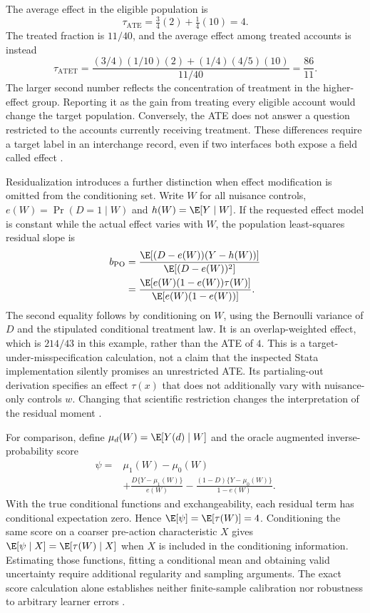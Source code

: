 The average effect in the eligible population is
\[
 \tau_{\mathrm{ATE}}=\tfrac34(2)+\tfrac14(10)=4.
\]
The treated fraction is $11/40$, and the average effect among treated
accounts is instead
\[
 \tau_{\mathrm{ATET}}
 =\frac{(3/4)(1/10)(2)+(1/4)(4/5)(10)}{11/40}
 =\frac{86}{11}.
\]
The larger second number reflects the concentration of treatment in the
higher-effect group. Reporting it as the gain from treating every eligible
account would change the target population. Conversely, the ATE does not
answer a question restricted to the accounts currently receiving treatment.
These differences require a target label in an interchange record, even if
two interfaces both expose a field called effect
\cite{exec13_ch_exact}.

Residualization introduces a further distinction when effect modification
is omitted from the conditioning set. Write $W$ for all nuisance controls,
$e(W)=\Pr(D=1\mid W)$ and $h(W)=\E[Y\mid W]$. If the requested effect
model is constant while the actual effect varies with $W$, the population
least-squares residual slope is
\begin{align*}
 b_{\mathrm{PO}}
 &=\frac{\E[(D-e(W))(Y-h(W))]}{\E[(D-e(W))^2]}\\
 &=\frac{\E[e(W)(1-e(W))\tau(W)]}{\E[e(W)(1-e(W))]}.
\end{align*}
The second equality follows by conditioning on $W$, using the Bernoulli
variance of $D$ and the stipulated conditional treatment law. It is an
overlap-weighted effect, which is $214/43$ in this example, rather than the
ATE of $4$. This is a target-under-misspecification calculation, not a
claim that the inspected Stata implementation silently promises an
unrestricted ATE. Its partialing-out derivation specifies an effect
$\tau(x)$ that does not additionally vary with nuisance-only controls $w$.
Changing that scientific restriction changes the interpretation of the
residual moment \cite{exec13_ch_stata,exec13_ch_exact}.

For comparison, define $\mu_d(W)=\E[Y(d)\mid W]$ and the oracle augmented
inverse-probability score
\begin{align*}
 \psi={}&\mu_1(W)-\mu_0(W)\\
 &+\frac{D\{Y-\mu_1(W)\}}{e(W)}
 -\frac{(1-D)\{Y-\mu_0(W)\}}{1-e(W)}.
\end{align*}
With the true conditional functions and exchangeability, each residual
term has conditional expectation zero. Hence $\E[\psi]=\E[\tau(W)]=4$.
Conditioning the same score on a coarser pre-action characteristic $X$
gives $\E[\psi\mid X]=\E[\tau(W)\mid X]$ when $X$ is included in the
conditioning information. Estimating those functions, fitting a conditional
mean and obtaining valid uncertainty require additional regularity and
sampling arguments. The exact score calculation alone establishes neither
finite-sample calibration nor robustness to arbitrary learner errors
\cite{exec13_ch_exact}.

